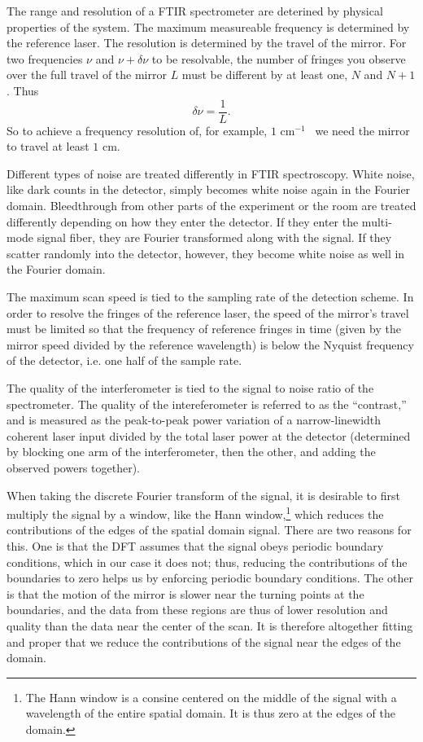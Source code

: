 \documentclass[12pt]{report}
\newcommand{\wn}[1][ ]{cm$^{-1}$#1}
\begin{document}
The range and resolution of a FTIR spectrometer are deterined by physical properties of the system. The maximum measureable frequency is determined by the reference laser. The resolution is determined by the travel of the mirror. For two frequencies $\nu$ and $\nu+\delta\nu$ to be resolvable, the number of fringes you observe over the full travel of the mirror $L$ must be different by at least one, $N$ and $N+1$. Thus 
\begin{equation}\label{eq:9}
\delta \nu = \frac{1}{L}.
\end{equation}
So to achieve a frequency resolution of, for example, $1$ \wn\ we need the mirror to travel at least $1$ cm.

Different types of noise are treated differently in FTIR spectroscopy. White noise, like dark counts in the detector, simply becomes white noise again in the Fourier domain. Bleedthrough from other parts of the experiment or the room are treated differently depending on how they enter the detector. If they enter the multi-mode signal fiber, they are Fourier transformed along with the signal. If they scatter randomly into the detector, however, they become white noise as well in the Fourier domain.

The maximum scan speed is tied to the sampling rate of the detection scheme. In order to resolve the fringes of the reference laser, the speed of the mirror's travel must be limited so that the frequency of reference fringes in time (given by the mirror speed divided by the reference wavelength) is below the Nyquist frequency of the detector, i.e. one half of the sample rate.

The quality of the interferometer is tied to the signal to noise ratio of the spectrometer. The quality of the intereferometer is referred to as the ``contrast,'' and is measured as the peak-to-peak power variation of a narrow-linewidth coherent laser input divided by the total laser power at the detector (determined by blocking one arm of the interferometer, then the other, and adding the observed powers together).

When taking the discrete Fourier transform of the signal, it is desirable to first multiply the signal by a window, like the Hann window,\footnote{The Hann window is a consine centered on the middle of the signal with a wavelength of the entire spatial domain. It is thus zero at the edges of the domain.} which reduces the contributions of the edges of the spatial domain signal. There are two reasons for this. One is that the DFT assumes that the signal obeys periodic boundary conditions, which in our case it does not; thus, reducing the contributions of the boundaries to zero helps us by enforcing periodic boundary conditions. The other is that the motion of the mirror is slower near the turning points at the boundaries, and the data from these regions are thus of lower resolution and quality than the data near the center of the scan. It is therefore altogether fitting and proper that we reduce the contributions of the signal near the edges of the domain.
\end{document}

